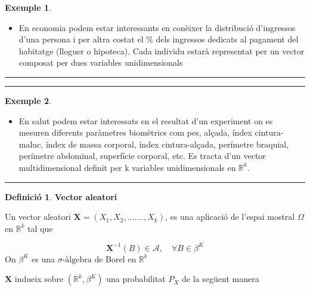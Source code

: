 \documentclass[
  catalan,
]{article}
\providecommand{\tightlist}{%
  \setlength{\itemsep}{0pt}\setlength{\parskip}{0pt}}
\theoremstyle{definition}
\newtheorem{definition}{Definició}[section]
\theoremstyle{definition}
\newtheorem{example}{Exemple}[section]
\theoremstyle{definition}
\theoremstyle{definition}
\theoremstyle{remark}
\begin{document}
\begin{example}
\leavevmode

\begin{itemize}
\tightlist
\item
  En economia podem estar interessants en conèixer la distribució d'ingressos d'una persona i per altra costat el \% dels ingressos dedicats al pagament del habitatge (lloguer o hipoteca). Cada individu estarà representat per un vector composat per dues variables unidimensionals
\end{itemize}

\end{example}

\begin{center}\rule{0.5\linewidth}{0.5pt}\end{center}

\begin{center}\rule{0.5\linewidth}{0.5pt}\end{center}

\begin{example}
\leavevmode

\begin{itemize}
\tightlist
\item
  En salut podem estar interessats en el resultat d'un experiment on es mesuren diferents paràmetres biomètrics com pes, alçada, índex cintura-maluc, índex de massa corporal, índex cintura-alçada, perímetre braquial, perímetre abdominal, superfície corporal, etc. Es tracta d'un vector multidimensional definit per k variables unidimensionals en \(\mathbb{R}^k\).
\end{itemize}

\end{example}

\begin{center}\rule{0.5\linewidth}{0.5pt}\end{center}

\begin{definition}
\textbf{Vector aleatori}

Un vector aleatori \(\mathbf{X}=(X_1,X_2,.......,X_k)\), es una aplicació de l'espai mostral \(\Omega\) en \(\mathbb{R}^k\) tal que

\[
\mathbf{X}^{-1}(B) \in\mathcal{A}, \quad \forall B \in \beta^K
\]
On \(\beta^K\) es una \(\sigma\text{-àlgebra}\) de Borel en \(\mathbb{R}^k\)
\end{definition}

\(\mathbf{X}\) indueix sobre \((\mathbb{R}^k,\beta^K)\) una probabilitat \(P_X\) de la següent manera
\end{document}
